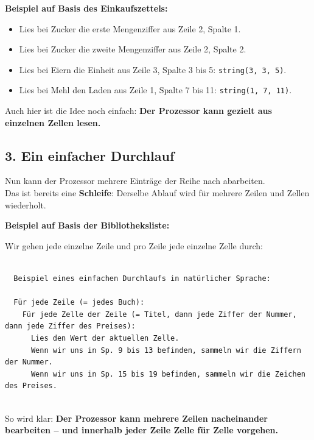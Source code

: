 \documentclass{article}
\begin{document}
        
\textbf{Beispiel auf Basis des Einkaufszettels:}

        \begin{itemize}
          \item Lies bei Zucker die erste Mengenziffer aus Zeile 2, Spalte 1.

          \item Lies bei Zucker die zweite Mengenziffer aus Zeile 2, Spalte 2.

          \item Lies bei Eiern die Einheit aus Zeile 3, Spalte 3 bis 5: \texttt{string(3, 3, 5)}.

          \item Lies bei Mehl den Laden aus Zeile 1, Spalte 7 bis 11: \texttt{string(1, 7, 11)}.

        \end{itemize}

        
Auch hier ist die Idee noch einfach: \textbf{Der Prozessor kann gezielt aus einzelnen Zellen lesen.}


        \subsection{3. Ein einfacher Durchlauf}
        
Nun kann der Prozessor mehrere Einträge der Reihe nach abarbeiten.\\
          Das ist bereits eine \textbf{Schleife}: Derselbe Ablauf wird für mehrere Zeilen und Zellen wiederholt.


        
\textbf{Beispiel auf Basis der Bibliotheksliste:}

        
Wir gehen jede einzelne Zeile und pro Zeile jede einzelne Zelle durch:

        \begin{verbatim}

  Beispiel eines einfachen Durchlaufs in natürlicher Sprache:

  Für jede Zeile (= jedes Buch):
    Für jede Zelle der Zeile (= Titel, dann jede Ziffer der Nummer, dann jede Ziffer des Preises):
      Lies den Wert der aktuellen Zelle.
      Wenn wir uns in Sp. 9 bis 13 befinden, sammeln wir die Ziffern der Nummer.
      Wenn wir uns in Sp. 15 bis 19 befinden, sammeln wir die Zeichen des Preises.
        
\end{verbatim}

        
So wird klar: \textbf{Der Prozessor kann mehrere Zeilen nacheinander bearbeiten – und innerhalb jeder Zeile Zelle für Zelle vorgehen.}
\end{document}
